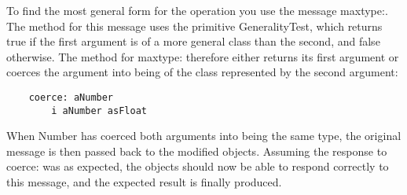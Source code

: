 To find the most general form for the operation you use the message maxtype:.
The method for this message uses the primitive GeneralityTest, which returns
true if the first argument is of a more general class than the second, and false
otherwise. The method for maxtype: therefore either returns its first argument
or coerces the argument into being of the class represented by the second
argument:
\begin{lstlisting}
    coerce: aNumber
        i aNumber asFloat
\end{lstlisting}

When Number has coerced both arguments into being the same type, the original
message is then passed back to the modified objects. Assuming the response to
coerce: was as expected, the objects should now be able to respond correctly to
this message, and the expected result is finally produced.
